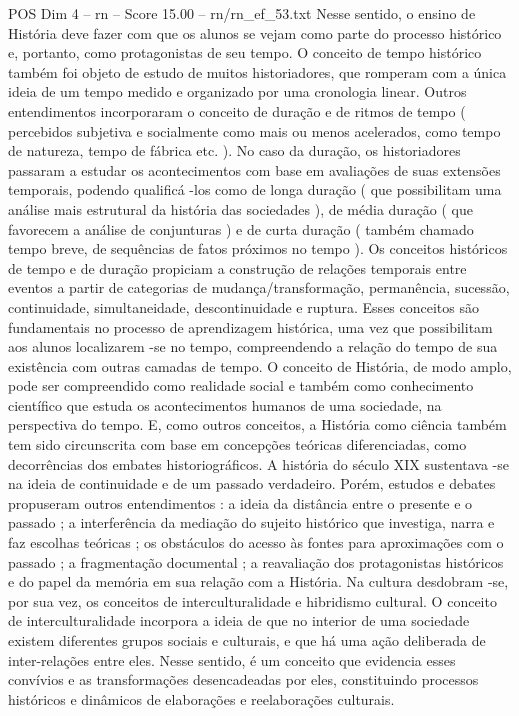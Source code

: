 \begin{textsample}{POS Dim 4 – rn – Score 15.00 – rn/rn\_ef\_53.txt}
Nesse sentido, o ensino de História deve fazer com que os alunos se vejam como parte do processo histórico e, portanto, como protagonistas de seu tempo.
O conceito de tempo histórico também foi objeto de estudo de muitos historiadores, que romperam com a única ideia de um tempo medido e organizado por uma cronologia linear.
Outros entendimentos incorporaram o conceito de duração e de ritmos de tempo ( percebidos subjetiva e socialmente como mais ou menos acelerados, como tempo de natureza, tempo de fábrica etc. ).
No caso da duração, os historiadores passaram a estudar os acontecimentos com base em avaliações de suas extensões temporais, podendo qualificá -los como de longa duração ( que possibilitam uma análise mais estrutural da história das sociedades ), de média duração ( que favorecem a análise de conjunturas ) e de curta duração ( também chamado tempo breve, de sequências de fatos próximos no tempo ).
Os conceitos históricos de tempo e de duração propiciam a construção de relações temporais entre eventos a partir de categorias de mudança/transformação, permanência, sucessão, continuidade, simultaneidade, descontinuidade e ruptura.
Esses conceitos são fundamentais no processo de aprendizagem histórica, uma vez que possibilitam aos alunos localizarem -se no tempo, compreendendo a relação do tempo de sua existência com outras camadas de tempo.
O conceito de História, de modo amplo, pode ser compreendido como realidade social e também como conhecimento científico que estuda os acontecimentos humanos de uma sociedade, na perspectiva do tempo.
E, como outros conceitos, a História como ciência também tem sido circunscrita com base em concepções teóricas diferenciadas, como decorrências dos embates historiográficos.
A história do século XIX sustentava -se na ideia de continuidade e de um passado verdadeiro.
Porém, estudos e debates propuseram outros entendimentos : a ideia da distância entre o presente e o passado ; a interferência da mediação do sujeito histórico que investiga, narra e faz escolhas teóricas ; os obstáculos do acesso às fontes para aproximações com o passado ; a fragmentação documental ; a reavaliação dos protagonistas históricos e do papel da memória em sua relação com a História.
Na cultura desdobram -se, por sua vez, os conceitos de interculturalidade e hibridismo cultural.
O conceito de interculturalidade incorpora a ideia de que no interior de uma sociedade existem diferentes grupos sociais e culturais, e que há uma ação deliberada de inter-relações entre eles.
Nesse sentido, é um conceito que evidencia esses convívios e as transformações desencadeadas por eles, constituindo processos históricos e dinâmicos de elaborações e reelaborações culturais.

\end{textsample}
